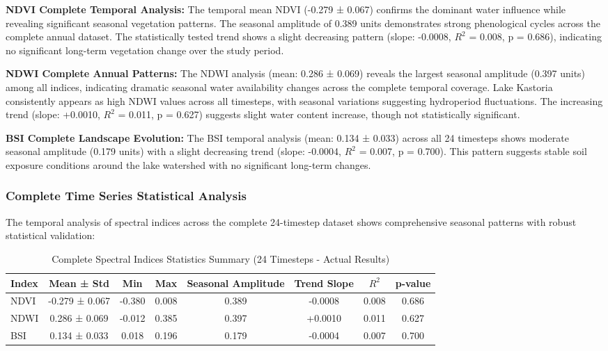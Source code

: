 \documentclass[a4paper,12pt]{article}
\begin{document}
\textbf{NDVI Complete Temporal Analysis:} The temporal mean NDVI (-0.279 ± 0.067) confirms
the dominant water influence while revealing significant seasonal vegetation
patterns. The seasonal amplitude of 0.389 units demonstrates strong phenological
cycles across the complete annual dataset. The statistically tested trend shows a slight
decreasing pattern (slope: -0.0008, $R^2$ = 0.008, p = 0.686), indicating no significant
long-term vegetation change over the study period.

\textbf{NDWI Complete Annual Patterns:} The NDWI analysis (mean: 0.286 ± 0.069) reveals
the largest seasonal amplitude (0.397 units) among all indices, indicating
dramatic seasonal water availability changes across the complete temporal coverage.
Lake Kastoria consistently appears as high NDWI values across all timesteps, with seasonal variations
suggesting hydroperiod fluctuations. The increasing trend (slope: +0.0010,
$R^2$ = 0.011, p = 0.627) suggests slight water content increase, though not statistically significant.

\textbf{BSI Complete Landscape Evolution:} The BSI temporal analysis (mean: 0.134 ± 0.033)
across all 24 timesteps shows moderate seasonal amplitude (0.179 units) with a slight
decreasing trend (slope: -0.0004, $R^2$ = 0.007, p = 0.700). This pattern suggests
stable soil exposure conditions around the lake watershed with no significant long-term changes.

\subsubsection{Complete Time Series Statistical Analysis}

The temporal analysis of spectral indices across the complete 24-timestep dataset shows
comprehensive seasonal patterns with robust statistical validation:

\begin{table}[H]
    \centering
    \caption{Complete Spectral Indices Statistics Summary (24 Timesteps - Actual Results)}
    \begin{tabular}{@{}lccccccc@{}}
        \toprule
        Index & Mean ± Std     & Min    & Max   & Seasonal Amplitude & Trend Slope & $R^2$ & p-value \\
        \midrule
        NDVI  & -0.279 ± 0.067 & -0.380 & 0.008 & 0.389 & -0.0008 & 0.008 & 0.686 \\
        NDWI  & 0.286 ± 0.069  & -0.012 & 0.385 & 0.397 & +0.0010 & 0.011 & 0.627 \\
        BSI   & 0.134 ± 0.033  & 0.018  & 0.196 & 0.179 & -0.0004 & 0.007 & 0.700 \\
        \bottomrule
    \end{tabular}
\end{table}
\end{document}
